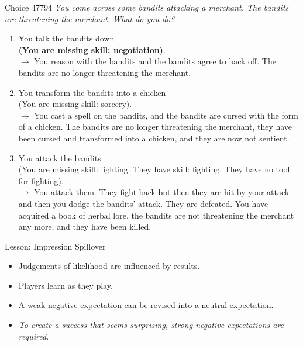 \documentclass[xcolor=x11names]{beamer}
\newcommand{\choicecount}[1]{\fbox{\upshape \sffamily #1}}
\begin{document}
\begin{frame}{Choice 47794}
\scriptsize
\itshape
You come across some bandits attacking a merchant.
% 
The bandits are threatening the merchant.
% 
What do you do?

\begin{enumerate}
\item You talk the bandits down  \\
  \textbf{(You are missing skill: negotiation)}. \\[0.3em]
\choicecount{6}$\rightarrow$ You reason with the bandits and the bandits agree to back off.  The bandits are no longer threatening the merchant. \\[-0.5em]
\item You transform the bandits into a chicken  \\
(You are missing skill: sorcery). \\[0.3em]
\choicecount{1}$\rightarrow$ You cast a spell on the bandits, and the bandits are cursed with the form of a chicken. The bandits are no longer threatening the merchant, they have been cursed and transformed into a chicken, and they are now not sentient. \\[-0.5em]
\item You attack the bandits  \\
(You are missing skill: fighting. They have skill: fighting. They have no tool for fighting). \\[0.3em]
\choicecount{3}$\rightarrow$ You attack them. They fight back but then they are hit by your attack and then you dodge the bandits' attack. They are defeated. You have acquired a book of herbal lore, the bandits are not threatening the merchant any more, and they have been killed.
\end{enumerate}
\end{frame}

\begin{frame}{Lesson: Impression Spillover}
  \begin{itemize}\addtolength{\itemsep}{0.5\baselineskip}
    \item Judgements of likelihood are influenced by results.
    \item Players learn as they play.
    \item A weak negative expectation can be revised into a neutral expectation.
    \item \emph{To create a success that seems surprising, strong negative expectations are required.}
  \end{itemize}
  \vfill
  \centering
  \tiny
\end{frame}
\end{document}
